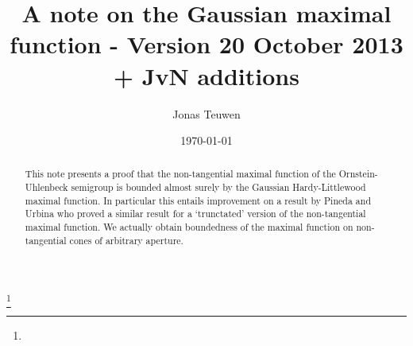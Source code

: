 \documentclass{amsart}
\theoremstyle{remark}
\begin{document}
\title[Gaussian maximal functions]{A note on the Gaussian maximal
  function - Version 20 October 2013 + JvN additions}



\author{Jonas Teuwen}%
\address{Delft Institute of Applied Mathematics,
  Delft University of Technology, P.O. Box 5031, 2600 GA Delft, The
  Netherlands}%
%
%
\thanks{}%
\date{\today}

\maketitle

\begin{abstract}
  This note presents a proof that 
  the non-tangential maximal function of the Ornstein-Uhlenbeck semigroup
  is bounded almost surely by the Gaussian Hardy-Littlewood maximal
  function.  In particular this entails improvement on a result by
  Pineda and Urbina \cite{Pineda2008} who proved a similar result for 
  a `trunctated' version of the non-tangential maximal function. 
  We actually obtain boundedness of the maximal function on non-tangential
  cones of arbitrary aperture.
\end{abstract}


\maketitle
\end{document}
